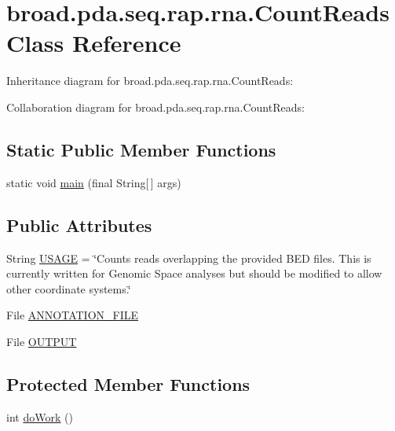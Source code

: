 \hypertarget{classbroad_1_1pda_1_1seq_1_1rap_1_1rna_1_1_count_reads}{\section{broad.\+pda.\+seq.\+rap.\+rna.\+Count\+Reads Class Reference}
\label{classbroad_1_1pda_1_1seq_1_1rap_1_1rna_1_1_count_reads}
}


Inheritance diagram for broad.\+pda.\+seq.\+rap.\+rna.\+Count\+Reads\+:


Collaboration diagram for broad.\+pda.\+seq.\+rap.\+rna.\+Count\+Reads\+:
\subsection*{Static Public Member Functions}
\begin{DoxyCompactItemize}
\item 
static void \hyperlink{classbroad_1_1pda_1_1seq_1_1rap_1_1rna_1_1_count_reads_a1748fd683317f43decca98e0586fd046}{main} (final String\mbox{[}$\,$\mbox{]} args)
\end{DoxyCompactItemize}
\subsection*{Public Attributes}
\begin{DoxyCompactItemize}
\item 
String \hyperlink{classbroad_1_1pda_1_1seq_1_1rap_1_1rna_1_1_count_reads_a889ad6de8a0db40425ff77dbf24aabfd}{U\+S\+A\+G\+E} = \char`\"{}Counts reads overlapping the provided B\+E\+D files. This is currently written for Genomic Space analyses but should be modified to allow other coordinate systems.\char`\"{}
\item 
File \hyperlink{classbroad_1_1pda_1_1seq_1_1rap_1_1rna_1_1_count_reads_a0b968bbfdf18dab50437a63348f365ac}{A\+N\+N\+O\+T\+A\+T\+I\+O\+N\+\_\+\+F\+I\+L\+E}
\item 
File \hyperlink{classbroad_1_1pda_1_1seq_1_1rap_1_1rna_1_1_count_reads_a063614ef19c16b390c8e3f75a5d38304}{O\+U\+T\+P\+U\+T}
\end{DoxyCompactItemize}
\subsection*{Protected Member Functions}
\begin{DoxyCompactItemize}
\item 
int \hyperlink{classbroad_1_1pda_1_1seq_1_1rap_1_1rna_1_1_count_reads_a39cb5668ecab7b71e7551df410c848c6}{do\+Work} ()
\end{DoxyCompactItemize}
